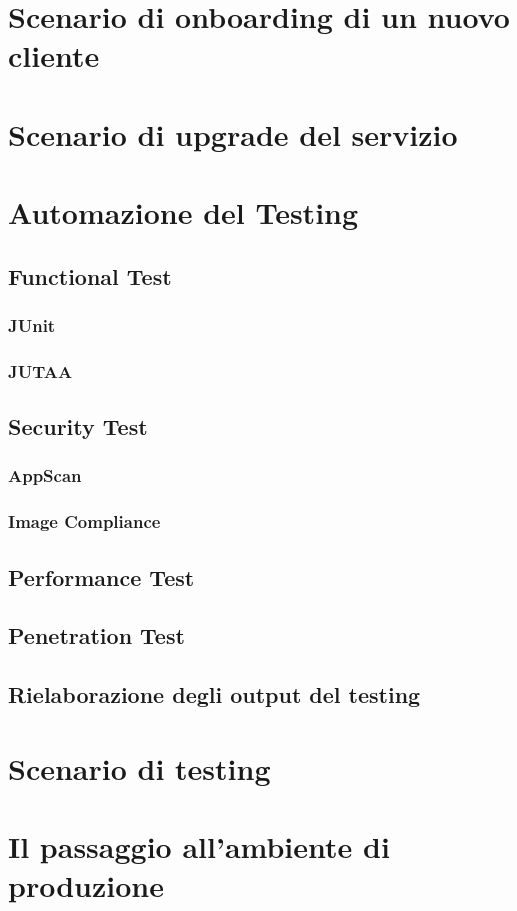 \section{Scenario di onboarding di un nuovo cliente}

\section{Scenario di upgrade del servizio}

\section{Automazione del Testing}
\subsection{Functional Test}
\subsubsection{JUnit}
\subsubsection{JUTAA}
\subsection{Security Test}
\subsubsection{AppScan}
\subsubsection{Image Compliance}
\subsection{Performance Test}
\subsection{Penetration Test}
\subsection{Rielaborazione degli output del testing}

\section{Scenario di testing}

\section{Il passaggio all'ambiente di produzione}

